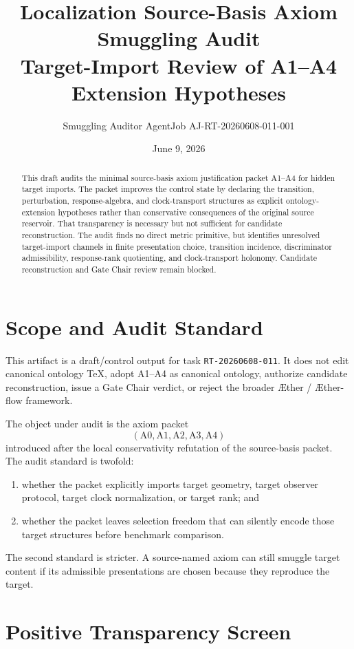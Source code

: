 \documentclass[11pt]{article}
\title{\textbf{Localization Source-Basis Axiom Smuggling Audit}\\[0.35em]
\large Target-Import Review of A1--A4 Extension Hypotheses}
\author{Smuggling Auditor AgentJob AJ-RT-20260608-011-001}
\date{June 9, 2026}
\newcommand{\Aether}{\AE{}ther}
\newcommand{\Aflow}{\AE{}ther-flow}
\newcommand{\TheoryProgram}{\Aether{} / \Aflow{} framework}
\begin{document}
\maketitle

\begin{abstract}
This draft audits the minimal source-basis axiom justification packet A1--A4
for hidden target imports. The packet improves the control state by declaring
the transition, perturbation, response-algebra, and clock-transport structures
as explicit ontology-extension hypotheses rather than conservative
consequences of the original source reservoir. That transparency is necessary
but not sufficient for candidate reconstruction. The audit finds no direct
metric primitive, but identifies unresolved target-import channels in finite
presentation choice, transition incidence, discriminator admissibility,
response-rank quotienting, and clock-transport holonomy. Candidate
reconstruction and Gate Chair review remain blocked.
\end{abstract}

\section{Scope and Audit Standard}

This artifact is a draft/control output for task
\texttt{RT-20260608-011}. It does not edit canonical ontology TeX, adopt
A1--A4 as canonical ontology, authorize candidate reconstruction, issue a
Gate Chair verdict, or reject the broader \TheoryProgram{}.

The object under audit is the axiom packet
\[
(\mathrm{A0},\mathrm{A1},\mathrm{A2},\mathrm{A3},\mathrm{A4})
\]
introduced after the local conservativity refutation of the source-basis
packet. The audit standard is twofold:
\begin{enumerate}
    \item whether the packet explicitly imports target geometry, target
    observer protocol, target clock normalization, or target rank; and
    \item whether the packet leaves selection freedom that can silently encode
    those target structures before benchmark comparison.
\end{enumerate}

The second standard is stricter. A source-named axiom can still smuggle target
content if its admissible presentations are chosen because they reproduce the
target.

\section{Positive Transparency Screen}
\end{document}
